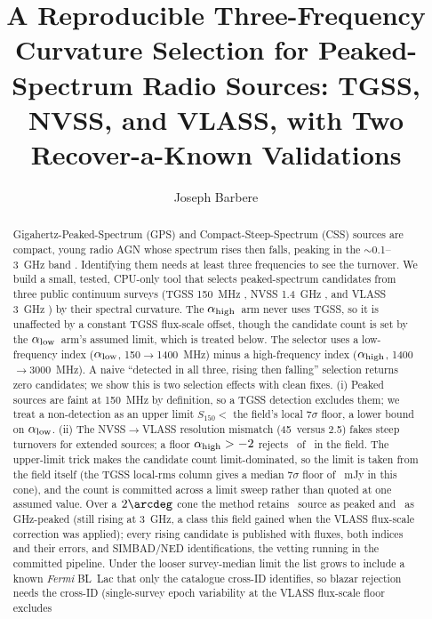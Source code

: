 \documentclass[twocolumn]{aastex631}
\newcommand{\alo}{\ensuremath{\alpha_{\rm low}}}
\newcommand{\ahi}{\ensuremath{\alpha_{\rm high}}}
\begin{document}
\title{A Reproducible Three-Frequency Curvature Selection for Peaked-Spectrum Radio Sources:
TGSS, NVSS, and VLASS, with Two Recover-a-Known Validations}

\author[0009-0008-3289-4447]{Joseph Barbere}

\begin{abstract}
Gigahertz-Peaked-Spectrum (GPS) and Compact-Steep-Spectrum (CSS) sources are compact, young radio
AGN whose spectrum rises then falls, peaking in the $\sim$0.1--3~GHz band \citep{odea1998,odea2021}.
Identifying them needs at least three frequencies to see the turnover. We build a small, tested, CPU-only
tool that selects peaked-spectrum candidates from three public continuum surveys (TGSS
150~MHz \citep{intema2017}, NVSS 1.4~GHz \citep{condon1998}, and VLASS 3~GHz \citep{lacy2020,
gordon2021}) by their spectral curvature. The \ahi\ arm never uses TGSS, so it is unaffected by a constant
TGSS flux-scale offset, though the candidate count is set by the \alo\ arm's assumed limit,
which is treated below. The selector
uses a low-frequency index (\alo, 150$\to$1400~MHz) minus a
high-frequency index (\ahi, 1400$\to$3000~MHz). A naive ``detected in all
three, rising then falling'' selection returns zero candidates; we show this is two selection
effects with clean fixes. (i) Peaked sources are faint at 150~MHz by definition, so a TGSS detection
excludes them; we treat a non-detection as an upper limit $S_{150}<$ the field's local
$7\sigma$ floor, a lower bound on \alo.
(ii) The NVSS$\to$VLASS resolution mismatch (45\arcsec\ versus 2.5\arcsec) fakes steep turnovers for
extended sources; a floor $\ahi>-2$ rejects \pkRealNextended\ of \pkRealNnvssvlass\ in the field.
The upper-limit trick makes the candidate count limit-dominated, so the limit is taken from the
field itself (the TGSS local-rms column gives a median $7\sigma$ floor of
\pkRealLimitUsed~mJy in this cone), and the count is committed across a limit sweep rather than
quoted at one assumed value. Over a $2\arcdeg$ cone the method retains \pkRealNpeaked\ source
as peaked and \pkRealNghzpeaked\ as GHz-peaked (still rising at 3~GHz, a class this field
gained when the VLASS flux-scale correction was applied); every rising candidate is published
with fluxes, both indices and their errors, and SIMBAD/NED identifications, the vetting running
in the committed pipeline. Under the looser survey-median limit the list grows to include a
known \textit{Fermi} BL~Lac that only the catalogue cross-ID identifies, so blazar rejection
needs the cross-ID (single-survey epoch variability at the VLASS flux-scale floor excludes

\end{abstract}
\end{document}
